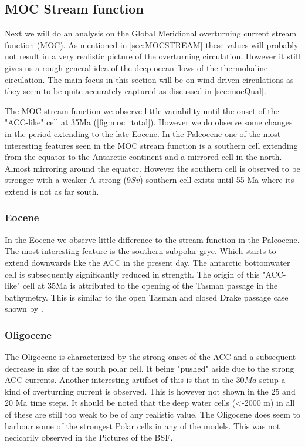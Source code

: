 \subsection{MOC Stream function}

Next we will do an analysis on the Global Meridional overturning current stream function (MOC). As mentioned in \cref{sec:MOCSTREAM} these values will probably not result in a very realistic picture of the overturning circulation. However it still gives us a rough general idea of the deep ocean flows of the thermohaline circulation. The main focus in this section will be on wind driven circulations as they seem to be quite accurately captured as discussed in \cref{sec:mocQual}. 

The MOC stream function we observe little variability until the onset of the "ACC-like" cell at 35Ma (\cref{fig:moc_total}). However we do observe some changes in the period extending to the late Eocene. In the Paleocene one of the most interesting features seen in the MOC stream function is a southern cell extending from the equator to the Antarctic continent and a mirrored cell in the north. Almost mirroring around the equator. However the southern cell is observed to be stronger with a weaker  A strong ($9 Sv$) southern cell exists until 55 Ma where its extend is not as far south.

\subsubsection{Eocene}
In the Eocene we observe little difference to the stream function in the Paleocene. The most interesting feature is the southern subpolar grye. Which starts to extend downwards like the ACC in the present day. The antarctic bottomwater cell is subsequently significantly reduced in strength.
The origin of this "ACC-like" cell at 35Ma is attributed to the opening of the Tasman passage in the bathymetry. This is similar to the open Tasman and closed Drake passage case shown by \cite{Sijp2011Dec}.  

\subsubsection{Oligocene}
The Oligocene is characterized by the strong onset of the ACC and a subsequent decrease in size of the south polar cell. It being "pushed" aside due to the strong ACC currents. Another interesting artifact of this is that in the $30 Ma$ setup a kind of overturning current is observed. This is however not shown in the 25 and 20 Ma time steps. It should be noted that the deep water cells (<-2000 m) in all of these are still too weak to be of any realistic value. The Oligocene does seem to harbour some of the strongest Polar cells in any of the models. This was not necicarily observed in the Pictures of the BSF.

